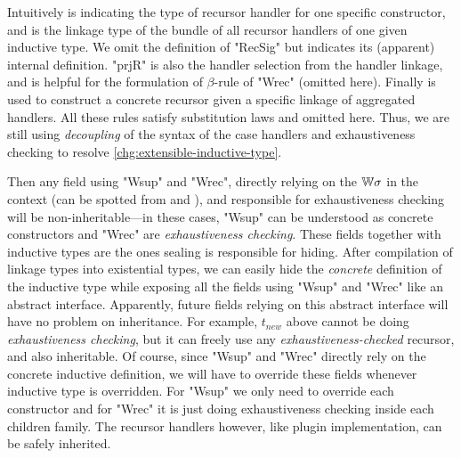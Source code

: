 Intuitively  is indicating the type of recursor handler
for one specific constructor, and  is the linkage type
of the bundle of all recursor handlers of one given inductive type. We
omit the definition of "RecSig" but  indicates its
(apparent) internal definition. "prjR" is also the handler selection
from the handler linkage, and is helpful for the formulation of
$\beta$-rule of "Wrec" (omitted here). Finally  is
used to construct a concrete recursor given a specific linkage of aggregated
handlers. All these rules satisfy substitution laws and omitted here. Thus, we are still using \textit{decoupling} of the syntax of the case
handlers and exhaustiveness checking to resolve
\ref{chg:extensible-inductive-type}. 

Then any field using "Wsup" and "Wrec", directly relying on the
${\mathbb{W}}\sigma$ in the context (can be spotted from  and
), and responsible for exhaustiveness checking will be non-inheritable---in these cases, "Wsup"
can be understood as concrete constructors and "Wrec" are
\textit{exhaustiveness checking}. These fields together with inductive
types are the ones sealing is responsible for hiding. After compilation
of linkage types into existential types, we can easily hide the
\textit{concrete} definition of the inductive type while exposing all
the fields using "Wsup" and "Wrec" like an abstract interface.
Apparently, future fields relying on this abstract interface will have no
problem on inheritance. 
For example, $t_{new}$ above cannot be doing \textit{exhaustiveness
checking}, but it can freely use any \textit{exhaustiveness-checked}
recursor, and also inheritable.
Of course, since "Wsup" and "Wrec" directly rely on the concrete inductive definition, we will have to override these fields whenever inductive type is overridden. For "Wsup" we only need to override each constructor and for "Wrec" it is just doing exhaustiveness checking inside each children family. The recursor handlers however, like plugin implementation, can be safely inherited.

